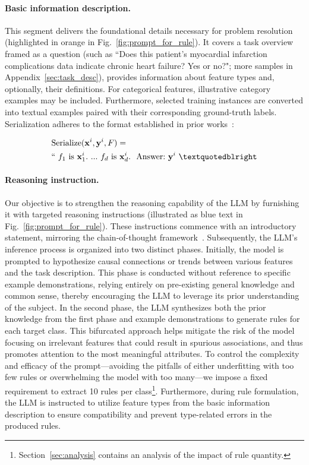 \vspace*{-0.12in}
\paragraph{Basic information description.} This segment delivers the foundational details necessary for problem resolution (highlighted in orange in Fig.~\ref{fig:prompt_for_rule}). It covers a task overview framed as a question (such as ``Does this patient's myocardial infarction complications data indicate chronic heart failure? Yes or no?"; more samples in Appendix~\ref{sec:task_desc}), provides information about feature types and, optionally, their definitions. For categorical features, illustrative category examples may be included. Furthermore, selected training instances are converted into textual examples paired with their corresponding ground-truth labels. Serialization adheres to the format established in prior works~\cite{dinh2022lift,hegselmann2023tabllm}:

\begin{align}
&\text{Serialize}(\mathbf{x}^i,\mathbf{y}^i, F) = \nonumber \\ 
&``\ f_1\ \text{is}\ \mathbf{x}^i_1.\ ... \ f_d\  \text{is}\  \mathbf{x}^i_d.\ \ \text{Answer:}\  \mathbf{y}^i\ ”
\end{align}

\vspace*{-0.12in}
\paragraph{Reasoning instruction.} Our objective is to strengthen the reasoning capability of the LLM by furnishing it with targeted reasoning instructions (illustrated as blue text in Fig.~\ref{fig:prompt_for_rule}). These instructions commence with an introductory statement, mirroring the chain-of-thought framework~\cite{wei2022chain}. Subsequently, the LLM’s inference process is organized into two distinct phases. Initially, the model is prompted to hypothesize causal connections or trends between various features and the task description. This phase is conducted without reference to specific example demonstrations, relying entirely on pre-existing general knowledge and common sense, thereby encouraging the LLM to leverage its prior understanding of the subject. In the second phase, the LLM synthesizes both the prior knowledge from the first phase and example demonstrations to generate rules for each target class. This bifurcated approach helps mitigate the risk of the model focusing on irrelevant features that could result in spurious associations, and thus promotes attention to the most meaningful attributes. To control the complexity and efficacy of the prompt—avoiding the pitfalls of either underfitting with too few rules or overwhelming the model with too many—we impose a fixed requirement to extract 10 rules per class\footnote{Section~\ref{sec:analysis} contains an analysis of the impact of rule quantity.}. Furthermore, during rule formulation, the LLM is instructed to utilize feature types from the basic information description to ensure compatibility and prevent type-related errors in the produced rules.

